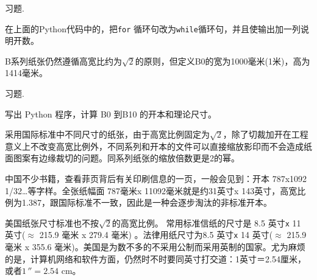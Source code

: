 \documentclass[main.tex]{subfiles}
\begin{document}
\begin{kaishu}习题.\end{kaishu} 在上面的Python代码中的，把\texttt{for} 循环句改为\texttt{while}循环句，并且使输出加一列说明开数。

B系列纸张仍然遵循高宽比约为$\sqrt{2}$的原则，但定义B0的宽为1000毫米(1米)，高为1414毫米。

\begin{kaishu}习题.\end{kaishu} 写出 Python 程序，计算 B0 到B10 的开本和理论尺寸。 

采用国际标准中不同尺寸的纸张，由于高宽比例固定为$\sqrt{2}$，除了切裁加开在工程意义上不改变高宽比例外，不同系列和开本的文件可以直接缩放影印而不会造成纸面图案有边缘裁切的问题。同系列纸张的缩放倍数更是2的幂。

中国不少书籍，查看菲页背后有关印刷信息的一页，一般会见到：开本 787x1092 1/32…等字样。全张纸幅面 787毫米x{ }11092毫米就是约31英寸x{ }143英寸，高宽比例为1.387，跟国际标准不一致，因此是一种会逐步淘汰的非标准开本。

美国纸张尺寸标准也不按$\sqrt{2}$的高宽比例。 常用标准信纸的尺寸是 8.5 英寸\texttt{x}{ }11 英寸($\approx$ 215.9 毫米 x 279.4 毫米) 。法律用纸尺寸为8.5 英寸\texttt{x}{ }14 英寸($\approx$ 215.9 毫米 x 355.6 毫米)。美国是为数不多的不采用公制而采用英制的国家。尤为麻烦的是，计算机网络和软件方面，仍然时不时要同英寸打交道：1英寸＝2.54厘米，或者$1\,'' = 2.54$ cm。
\newpage
\end{document}
